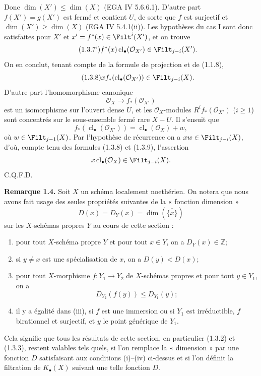 \documentclass[11pt]{article}
\newcommand{\cl}{\operatorname{cl}}
\begin{document}
Donc $\dim(X')\leq\dim(X)$ (EGA IV 5.6.6.1). D'autre part $f(X')=g(X')$ est fermé et contient $U$, de sorte que $f$ est surjectif et $\dim(X')\geq\dim(X)$ (EGA IV 5.4.1(ii)). Les hypothèses du cas I sont donc satisfaites pour $X'$ et $x'=f^*(x)\in\Filt^i(X')$, et on trouve
\begin{equation}\tag{1.3.7'}
f^*(x)\cl_\bullet(\mathcal O_{X'})\in\Filt_{j-i}(X').
\end{equation}
On en conclut, tenant compte de la formule de projection et de (1.1.8),
\begin{equation}\tag{1.3.8}
x f_*(\cl_\bullet(\mathcal O_{X'}))\in\Filt_{j-i}(X).
\end{equation}
D'autre part l'homomorphisme canonique
\[
\mathcal O_X\longrightarrow f_*(\mathcal O_{X'})
\]
est un isomorphisme sur l'ouvert dense $U$, et les $\mathcal O_X$-modules $R^if_*(\mathcal O_{X'})$ ($i\geq1$) sont concentrés sur le sous-ensemble fermé rare $X-U$. Il s'ensuit que
\begin{equation}\tag{1.3.9}
f_*(\cl_\bullet(\mathcal O_{X'}))=\cl_\bullet(\mathcal O_X)+w,
\end{equation}
où $w\in\Filt_{j-1}(X)$. Par l'hypothèse de récurrence on a $xw\in\Filt_{j-i}(X)$, d'où, compte tenu des formules (1.3.8) et (1.3.9), l'assertion
\[
x\cl_\bullet(\mathcal O_X)\in\Filt_{j-i}(X).
\]
C.Q.F.D.

\textbf{Remarque 1.4.} Soit $X$ un schéma localement noethérien. On notera que nous avons fait usage des seules propriétés suivantes de la « fonction dimension »
\[
D(x)=D_Y(x)=\dim(\overline{\{x\}})
\]
sur les $X$-schémas propres $Y$ au cours de cette section :
\begin{enumerate}[label=(\roman*)]
\item pour tout $X$-schéma propre $Y$ et pour tout $x\in Y$, on a $D_Y(x)\in\mathbb Z$;
\item si $y\ne x$ est une spécialisation de $x$, on a $D(y)<D(x)$;
\item pour tout $X$-morphisme $f:Y_1\to Y_2$ de $X$-schémas propres et pour tout $y\in Y_1$, on a
\[
D_{Y_2}(f(y))\leq D_{Y_1}(y);
\]
\item il y a égalité dans (iii), si $f$ est une immersion ou si $Y_1$ est irréductible, $f$ birationnel et surjectif, et $y$ le point générique de $Y_1$.
\end{enumerate}
Cela signifie que tous les résultats de cette section, en particulier (1.3.2) et (1.3.3), restent valables tels quels, si l'on remplace la « dimension » par une fonction $D$ satisfaisant aux conditions (i)--(iv) ci-dessus et si l'on définit la filtration de $K_\bullet(X)$ suivant une telle fonction $D$.
\end{document}
